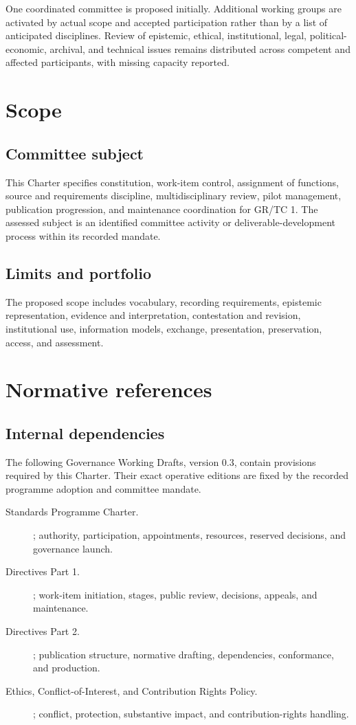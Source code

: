 \documentclass[11pt,a4paper]{article}
\begin{document}
One coordinated committee is proposed initially. Additional working groups are activated by actual scope and accepted participation rather than by a list of anticipated disciplines. Review of epistemic, ethical, institutional, legal, political-economic, archival, and technical issues remains distributed across competent and affected participants, with missing capacity reported.

\GSPmainmatter
\section{Scope}
\subsection{Committee subject}
This Charter specifies constitution, work-item control, assignment of functions, source and requirements discipline, multidisciplinary review, pilot management, publication progression, and maintenance coordination for GR/TC 1. The assessed subject is an identified committee activity or deliverable-development process within its recorded mandate.


\subsection{Limits and portfolio}
The proposed scope includes vocabulary, recording requirements, epistemic representation, evidence and interpretation, contestation and revision, institutional use, information models, exchange, presentation, preservation, access, and assessment.


\section{Normative references}
\subsection{Internal dependencies}
The following Governance Working Drafts, version 0.3, contain provisions required by this Charter. Their exact operative editions are fixed by the recorded programme adoption and committee mandate.

\begin{description}
\item[Standards Programme Charter.] ; authority, participation, appointments, resources, reserved decisions, and governance launch.
\item[Directives Part 1.] ; work-item initiation, stages, public review, decisions, appeals, and maintenance.
\item[Directives Part 2.] ; publication structure, normative drafting, dependencies, conformance, and production.
\item[Ethics, Conflict-of-Interest, and Contribution Rights Policy.] ; conflict, protection, substantive impact, and contribution-rights handling.
\end{description}
\end{document}
